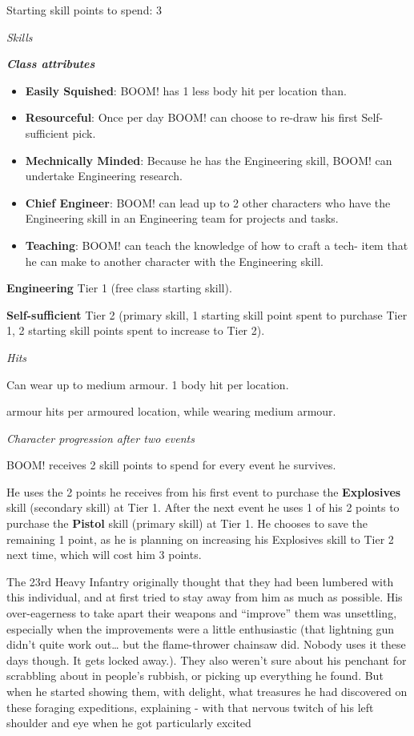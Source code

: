 Starting skill points to spend: 3

\textit{Skills}

\textbf{\textit{Class attributes}}

\begin{itemize}
\item \textbf{Easily Squished}: BOOM! has 1 less body hit per location than.

\item \textbf{Resourceful}: Once per day BOOM! can choose to re-draw his first Self-sufficient pick.

\item \textbf{Mechnically Minded}: Because he has the Engineering skill, BOOM! can undertake Engineering research.

\item \textbf{Chief Engineer}: BOOM! can lead up to 2 other characters who have the Engineering skill in an Engineering team for projects and tasks.

\item \textbf{Teaching}: BOOM! can teach the knowledge of how to craft a tech- item that he can make to another character with the Engineering skill.

\end{itemize}
\textbf{Engineering} Tier 1 (free class starting skill).

\textbf{Self-sufficient} Tier 2 (primary skill, 1 starting skill point spent to purchase Tier 1, 2 starting skill points spent to increase to Tier 2).

\textit{Hits}

Can wear up to medium armour. 1 body hit per location.

armour hits per armoured location, while wearing medium armour.

\textit{Character progression after two events}

BOOM! receives 2 skill points to spend for every event he survives.

He uses the 2 points he receives from his first event to purchase the \textbf{Explosives} skill (secondary skill) at Tier 1. After the next event he uses 1 of his 2 points to purchase the \textbf{Pistol} skill (primary skill) at Tier 1. He chooses to save the remaining 1 point, as he is planning on increasing his Explosives skill to Tier 2 next time, which will cost him 3 points.

The 23rd Heavy Infantry originally thought that they had been lumbered with this individual, and at first tried to stay away from him as much as possible. His over-eagerness to take apart their weapons and ``improve'' them was unsettling, especially when the improvements were a little enthusiastic (that lightning gun didn't quite work out{\dots} but the flame-thrower chainsaw did. Nobody uses it these days though. It gets locked away.). They also weren't sure about his penchant for scrabbling about in people's rubbish, or picking up everything he found. But when he started showing them, with delight, what treasures he had discovered on these foraging expeditions, explaining - with that nervous twitch of his left shoulder and eye when he got particularly excited

